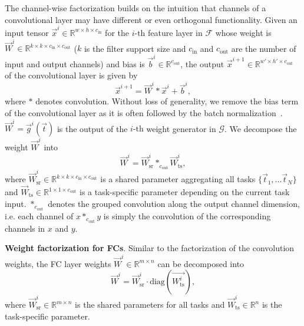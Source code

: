 \documentclass[10pt,twocolumn,letterpaper]{article}
\newcommand{\joey}[1]{\textcolor{blue}{[Joey: #1]}}
\newcommand\minisection[1]{\vspace{2mm}\noindent \textbf{#1}}
\begin{document}
The channel-wise factorization builds on the intuition 
that channels of a convolutional layer
may have different or even orthogonal functionality. 
Given an input tensor $\Vec{x}^i\in \mathbb{R}^{w\times h\times c_\text{in}}$ for
the $i\text{-th}$ feature layer in $\mathcal{F}$ whose weight is $\Vec{W}^i \in\mathbb{R}^{k\times k\times c_\text{in}\times c_\text{out}}$ 
($k$ is the filter support size and $c_\text{in}$ and $c_\text{out}$ are 
the number of input and output channels) and bias is  $\Vec{b}^i\in\mathbb{R}^{c_\text{out}}$, the output $\Vec{x}^{i+1}\in \mathbb{R}^{w'\times h'\times c_\text{out}}$ of the convolutional layer is given
by 
\begin{equation}
    \Vec{x}^{i+1} = \Vec{W}^i * \Vec{x}^{i} + \Vec{b}^{i},
\end{equation}
where $*$ denotes convolution. Without loss of generality, we remove the bias term of the convolutional layer as it is often followed by the batch normalization~\cite{ioffe2015batch}. $\Vec{W}^i = \Vec{g}^i(\Vec{t})$ is
the output of the $i\text{-th}$ weight generator in $\mathcal{G}$.  
We decompose the 
weight $\Vec{W}^i$ into 
\begin{equation}
\Vec{W}^i=\Vec{W}^i_\text{sr} *_{c_{\text{out}}} \Vec{W}^i_\text{ts},
\end{equation}
where $\Vec{W}^i_\text{sr}\in\mathbb{R}^{k\times k \times c_\text{in}\times c_\text{out}}$ is a shared parameter aggregating all tasks $\{\Vec{t}_1, ...\Vec{t}_N\}$ and $\Vec{W}_\text{ts}\in\mathbb{R}^{1\times1\times c_\text{out}}$
is a task-specific parameter depending on the current task input.
$*_{c_\text{out}}$ denotes the grouped convolution along the output channel dimension,
i.e. each channel of $x*_{c_\text{out}} y$ is simply the convolution of the corresponding channels in $x$ and $y$. 

\minisection{Weight factorization for FCs}. 
Similar to the factorization of the convolution weights,
the FC layer weights $\Vec{W}^i\in\mathbb{R}^{m\times n}$ can be decomposed into 
\begin{equation}
    \Vec{W}^i = \Vec{W}^i_\text{sr} \cdot \text{diag}(\Vec{W^i_\text{ts}}),
\end{equation}
where $ \Vec{W}^i_\text{sr}\in\mathbb{R}^{m\times n}$ is the shared parameters for
all tasks and $\Vec{W}^i_\text{ts}\in\mathbb{R}^{n}$ is the task-specific parameter.
\end{document}
